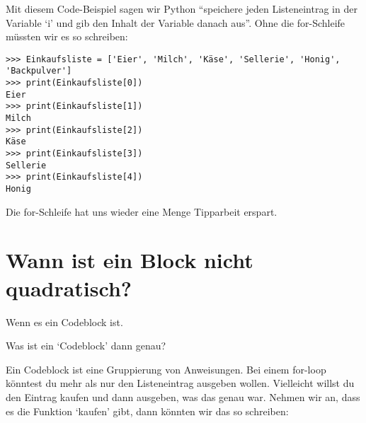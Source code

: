 Mit diesem Code-Beispiel sagen wir Python ``speichere jeden Listeneintrag in der Variable `i' und gib den Inhalt der Variable danach aus''. Ohne die for-Schleife müssten wir es so schreiben:

\begin{Verbatim}[frame=single]
>>> Einkaufsliste = ['Eier', 'Milch', 'Käse', 'Sellerie', 'Honig', 'Backpulver']
>>> print(Einkaufsliste[0])
Eier
>>> print(Einkaufsliste[1])
Milch
>>> print(Einkaufsliste[2])
Käse
>>> print(Einkaufsliste[3])
Sellerie
>>> print(Einkaufsliste[4])
Honig
\end{Verbatim}

Die for-Schleife hat uns wieder eine Menge Tipparbeit erspart.

\section{Wann ist ein Block nicht quadratisch?}

Wenn es ein Codeblock ist.
\par
\noindent
Was ist ein `Codeblock' dann genau?
\par
Ein Codeblock ist eine Gruppierung von Anweisungen. Bei einem for-loop könntest du mehr als nur den Listeneintrag ausgeben wollen. Vielleicht willst du den Eintrag kaufen und dann ausgeben, was das genau war. Nehmen wir an, dass es die Funktion `kaufen' gibt, dann könnten wir das so schreiben:

